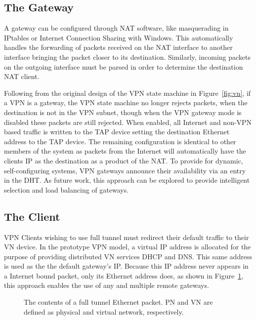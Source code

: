 \subsection{The Gateway}
\label{the_gateway}
A gateway can be configured through NAT software, like masquerading in IPtables
or Internet Connection Sharing with Windows.  This automatically handles the
forwarding of packets received on the NAT interface to another interface
bringing the packet closer to its destination.  Similarly, incoming packets
on the outgoing interface must be parsed in order to determine the destination
NAT client.

Following from the original design of the VPN state machine in
Figure~\ref{fig:vn}, if a VPN is a gateway, the VPN state machine no longer
rejects packets, when the destination is not in the VPN subnet, though when the
VPN gateway mode is disabled these packets are still rejected.  When enabled,
all Internet and non-VPN based traffic is written to the TAP device setting the
destination Ethernet address to the TAP device.  The remaining configuration is
identical to other members of the system as packets from the Internet will
automatically have the clients IP as the destination as a product of the NAT.
To provide for dynamic, self-configuring systems, VPN gateways announce their
availability via an entry in the DHT.  As future work, this approach can be
explored to provide intelligent selection and load balancing of gateways.

\subsection{The Client}
VPN Clients wishing to use full tunnel must redirect their default traffic to
their VN device.  In the prototype VPN model, a virtual IP address is allocated
for the purpose of providing distributed VN services DHCP and DNS.  This same
address is used as the the default gateway's IP.  Because this IP address never
appears in a Internet bound packet, only its Ethernet address does, as shown in
Figure~\ref{fig:tunnel_packet}, this approach enables the use of any and
multiple remote gateways.

\begin{figure}
\centering
{}
\caption[The contents of a full tunnel Ethernet packet]{The contents of a full
tunnel Ethernet packet.  PN and VN are defined as physical and virtual network,
respectively.}
\label{fig:tunnel_packet}
\end{figure}

